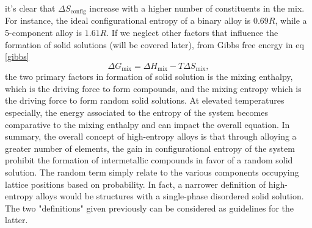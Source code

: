  it's clear that $\Delta S_{\text{config}}$ increase with a higher number of constituents in the mix. For instance, the ideal configurational entropy of a binary alloy is $0.69R$, while a 5-component alloy is $1.61R$. If we neglect other factors that influence the formation of solid solutions (will be covered later), from Gibbs free energy in eq \ref{gibbs}
\begin{equation}
\Delta G_{\text{mix}} = \Delta H_{\text{mix}} - T\Delta S_{\text{mix}}, \label{gibbs}
\end{equation} 
the two primary factors in formation of solid solution is the mixing enthalpy, which is the driving force to form compounds, and the mixing entropy which is the driving force to form random solid solutions. At elevated temperatures especially, the energy associated to the entropy of the system becomes comparative to the mixing enthalpy and can impact the overall equation. In summary, the overall concept of high-entropy alloys is that through alloying a greater number of elements, the gain in configurational entropy of the system prohibit the formation of intermetallic compounds in favor of a random solid solution. The random term simply relate to the various components occupying lattice positions based on probability. In fact, a narrower definition of high-entropy alloys would be structures with a single-phase disordered solid solution. The two "definitions" given previously can be considered as guidelines for the latter.
 
